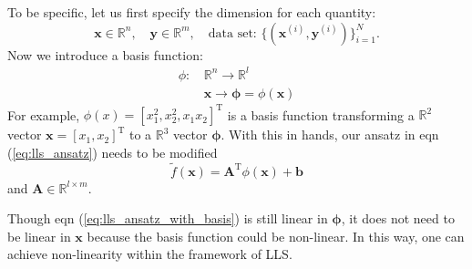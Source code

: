 \documentclass[a4paper,twoside, 10pt]{article}
\theoremstyle{wick}
\newcommand{\tr}{\textrm}
\newcommand{\mat}[1]{\mathbf{#1}}
\begin{document}
	To be specific, let us first specify the dimension for each quantity:
	\begin{equation}
		\bm{x} \in \mathbb{R}^n,\quad{}
		\bm{y} \in \mathbb{R}^m,\quad{}
		\tr{data set: }\{(\bm{x}^{(i)}, \bm{y}^{(i)})\}_{i = 1}^N.
	\end{equation}
	Now we introduce a basis function:
	\begin{equation}
	\begin{split}
		\phi:&\, \mathbb{R}^n \to \mathbb{R}^l		\\
			 &\, \bm{x} \to \bm{\phi} = \phi(\bm{x})
	\end{split}
	\end{equation}
	For example, $\phi(x) = [x_1^2, x_2^2, x_1x_2]^{\tr{T}}$ is a basis function transforming a $\mathbb{R}^2$ vector $\bm{x} = [x_1, x_2]^{\tr{T}}$ to a $\mathbb{R}^3$ vector $\bm{\phi}$. With this in hands, our ansatz in eqn (\ref{eq:lls_ansatz}) needs to be modified
	\begin{equation}	\label{eq:lls_ansatz_with_basis}
		\tilde{f}(\bm{x})
			= \mat{A}^{\tr{T}} \phi(\bm{x}) + \bm{b}
	\end{equation}
	and $\mat{A} \in \mathbb{R}^{l \times{} m}$.

	Though eqn (\ref{eq:lls_ansatz_with_basis}) is still linear in $\bm{\phi}$, it does not need to be linear in $\bm{x}$ because the basis function could be non-linear. In this way, one can achieve non-linearity within the framework of LLS.
\end{document}
